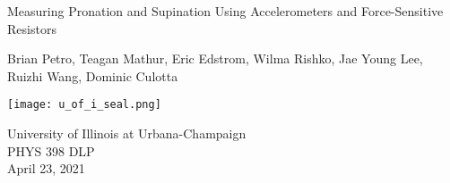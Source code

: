 \begin{titlepage}
  \begin{center}
    \vspace*{1cm}

    \Huge
    Measuring Pronation and Supination Using Accelerometers and Force-Sensitive Resistors

    \vspace{1.5cm}

    \large Brian Petro, Teagan Mathur, Eric Edstrom, Wilma Rishko,
    Jae Young Lee, Ruizhi Wang, Dominic Culotta

    \vspace{0.8cm}

    \texttt{[image: u\_of\_i\_seal.png]}

    \vfill

    \Large
    University of Illinois at Urbana-Champaign\\
    PHYS 398 DLP\\
    April 23, 2021

    \end{center}
  \end{titlepage}
